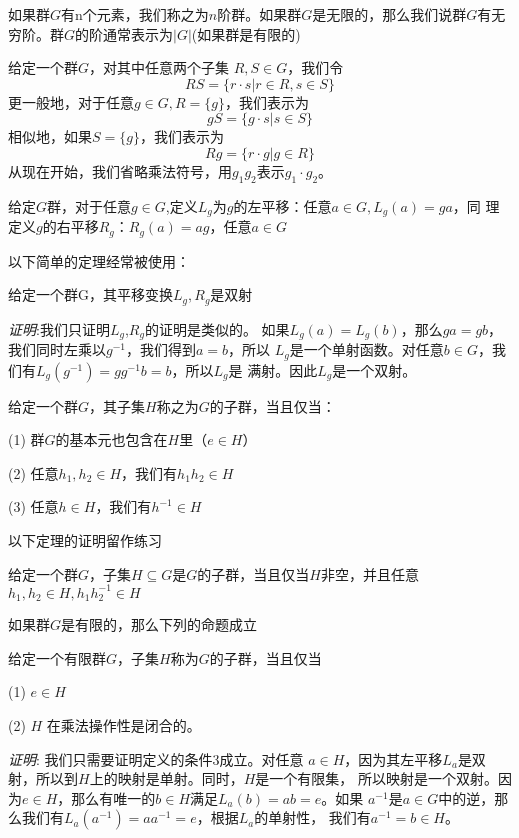 \begin{definition}
  如果群$G$有n个元素，我们称之为$n$阶群。如果群$G$是无限的，那么我们说群$G$有无
  穷阶。群$G$的阶通常表示为$|G|$(如果群是有限的)
\end{definition}
给定一个群$G$，对其中任意两个子集 $R,S\in G$，我们令
\[
  RS = \{r\cdot s| r\in R, s \in S\}
\]
更一般地，对于任意$g\in G, R=\{g\}$，我们表示为
\[
  gS = \{g\cdot s| s \in S\}
\]
相似地，如果$S=\{g\}$，我们表示为
\[
  Rg = \{r\cdot g| g\in R\}
\]
从现在开始，我们省略乘法符号，用$g_1g_2$表示$g_1\cdot g_2$。
\begin{definition}
给定$G$群，对于任意$g\in G$,定义$L_g$为$g$的左平移：任意$a\in G, L_g(a) = ga$，同
理定义$g$的右平移$R_g$：$R_g(a) = ag$，任意$a \in G$
\end{definition}
以下简单的定理经常被使用：
\begin{proposition}
  给定一个群G，其平移变换$L_g, R_g$是双射
\end{proposition}
\emph{证明}:我们只证明$L_g$,$R_g$的证明是类似的。
如果$L_g(a)=L_g(b)$，那么$ga=gb$，我们同时左乘以$g^{-1}$，我们得到$a=b$，所以
$L_g$是一个单射函数。对任意$b \in G$，我们有$L_g(g^{-1})=gg^{-1}b=b$，所以$L_g$是
满射。因此$L_g$是一个双射。
\begin{definition} %
  给定一个群$G$，其子集$H$称之为$G$的子群，当且仅当：
   
(1) 群$G$的基本元也包含在$H$里（$e\in H$）

(2) 任意$h_1, h_2 \in H$，我们有$h_1h_2 \in H$

(3) 任意$h\in H$，我们有$h^{-1} \in H$
\end{definition}
以下定理的证明留作练习
\begin{proposition}
给定一个群$G$，子集$H \subseteq G$是$G$的子群，当且仅当$H$非空，并且任意$h_1,h_2 \in
H,h_1h_2^{-1} \in H$
\end{proposition}
如果群$G$是有限的，那么下列的命题成立
\begin{proposition}
  给定一个有限群$G$，子集$H$称为$G$的子群，当且仅当

  (1) $e\in H $

  (2) $H$ 在乘法操作性是闭合的。

\end{proposition}
\emph{证明}: 我们只需要证明定义的条件3成立。对任意
$a\in H$，因为其左平移$L_a$是双射，所以到$H$上的映射是单射。同时，$H$是一个有限集，
所以映射是一个双射。因为$e\in H$，那么有唯一的$b\in H$满足$L_a(b)=ab=e$。如果
$a^{-1}$是$a\in G$中的逆，那么我们有$L_a(a^{-1}) = aa^{-1}=e$，根据$L_a$的单射性，
我们有$a^{-1}=b\in H$。

